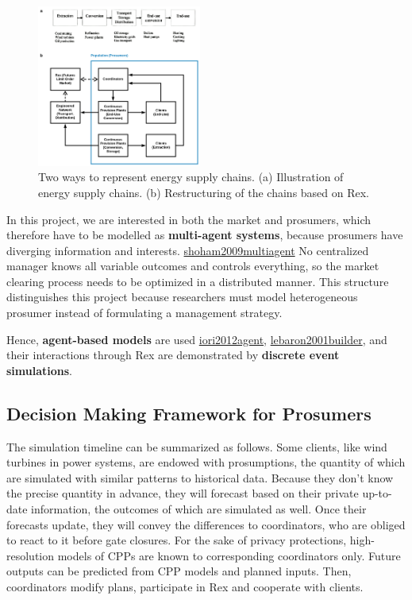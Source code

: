 \documentclass[letterpaper,8pt,twocolumn,twoside,]{pinp}
\begin{document}
\begin{figure}
\centering
\includegraphics[width=0.48\textwidth]{../../../images/1-3.png}
\caption{Two ways to represent energy supply chains. (a) Illustration of energy supply chains. (b) Restructuring of the chains based on Rex.}
\label{1}
\end{figure}

In this project, we are interested in both the market and prosumers,
which therefore have to be modelled as \textbf{multi-agent systems},
because prosumers have diverging information and interests.
\protect\hyperlink{reference}{shoham2009multiagent} No centralized
manager knows all variable outcomes and controls everything, so the
market clearing process needs to be optimized in a distributed manner.
This structure distinguishes this project because researchers must model
heterogeneous prosumer instead of formulating a management strategy.

Hence, \textbf{agent-based models} are used
\protect\hyperlink{reference}{iori2012agent},
\protect\hyperlink{reference}{lebaron2001builder}, and their
interactions through Rex are demonstrated by \textbf{discrete event
simulations}.

\hypertarget{decision-making-framework-for-prosumers}{%
\subsection{Decision Making Framework for
Prosumers}\label{decision-making-framework-for-prosumers}}

\label{RHPO}

The simulation timeline can be summarized as follows. Some clients, like
wind turbines in power systems, are endowed with prosumptions, the
quantity of which are simulated with similar patterns to historical
data. Because they don't know the precise quantity in advance, they will
forecast based on their private up-to-date information, the outcomes of
which are simulated as well. Once their forecasts update, they will
convey the differences to coordinators, who are obliged to react to it
before gate closures. For the sake of privacy protections,
high-resolution models of CPPs are known to corresponding coordinators
only. Future outputs can be predicted from CPP models and planned
inputs. Then, coordinators modify plans, participate in Rex and
cooperate with clients.
\end{document}
